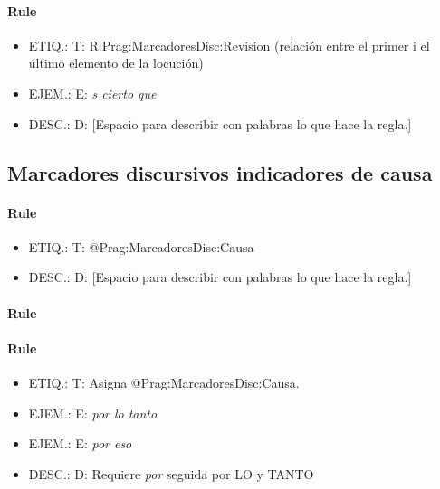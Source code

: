 \documentclass[11pt]{report}
\begin{document}
\paragraph*{Rule}
\begin{itemize}
\item ETIQ.:  T: R:Prag:MarcadoresDisc:Revision (relación entre el primer i el último elemento de la locución)
\item EJEM.:  E: \emph{s cierto que}
\item DESC.:  D: [Espacio para describir con palabras lo que hace la regla.]
\end{itemize}

\subsection{Marcadores discursivos indicadores de causa}
\paragraph*{Rule}
\begin{itemize}
\item ETIQ.:  T: @Prag:MarcadoresDisc:Causa
\item DESC.:  D: [Espacio para describir con palabras lo que hace la regla.]
\end{itemize}

\paragraph*{Rule}
\paragraph*{Rule}
\begin{itemize}
\item ETIQ.:  T: Asigna @Prag:MarcadoresDisc:Causa.
\item EJEM.:  E: \emph{por lo tanto}
\item EJEM.:  E: \emph{por eso}
\item DESC.:  D: Requiere \emph{por} seguida por LO y TANTO
\end{itemize}
\end{document}
